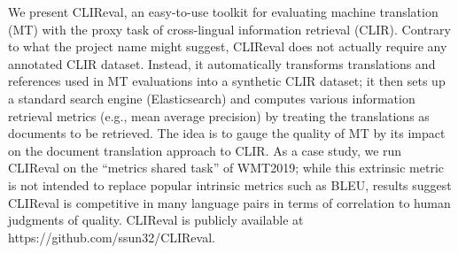 We present CLIReval, an easy-to-use toolkit for evaluating machine translation (MT) with the proxy task of cross-lingual information retrieval (CLIR). Contrary to what the project name might suggest, CLIReval does not actually require any annotated CLIR dataset. Instead, it automatically transforms translations and references used in MT evaluations into a synthetic CLIR dataset; it then sets up a standard search engine (Elasticsearch) and computes various information retrieval metrics (e.g., mean average precision) by treating the translations as documents to be retrieved. The idea is to gauge the quality of MT by its impact on the document translation approach to CLIR. As a case study, we run CLIReval on the ``metrics shared task'' of WMT2019; while this extrinsic metric is not intended to replace popular intrinsic metrics such as BLEU, results suggest CLIReval is competitive in many language pairs in terms of correlation to human judgments of quality. CLIReval is publicly available at https://github.com/ssun32/CLIReval.
